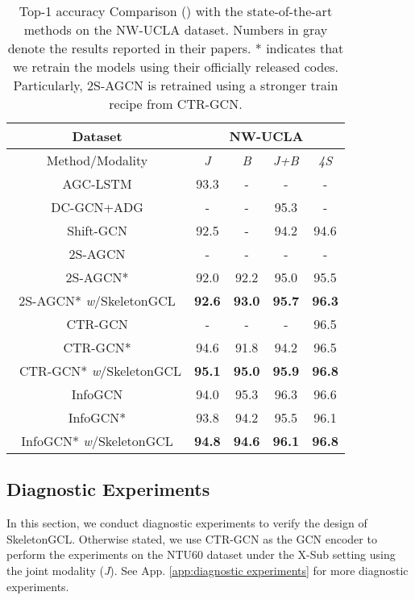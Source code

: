 \documentclass{article} \usepackage{iclr2023_conference,times}
\begin{document}
\begin{table}[h]
    \centering
    \scriptsize
    \caption{Top-1 accuracy Comparison () with the state-of-the-art methods on the NW-UCLA dataset. Numbers in gray denote the results reported in their papers. * indicates that we retrain the models using their officially released codes. Particularly, 2S-AGCN is retrained using a stronger train recipe from CTR-GCN.}
    \begin{tabular}{c||c|c|c|c}
\rowcolor{gray!30} Dataset & \multicolumn{4}{c}{NW-UCLA} \\\hline
        \rowcolor{gray!30} Method/Modality & \textit{J} & \textit{B} & \textit{J+B} & \textit{4S} \\
        \hline \hline
        AGC-LSTM \citep{AGC-LSTM} & 93.3 & - & - & - \\
        DC-GCN+ADG \citep{decouplinggcn} & - & - & 95.3 & - \\ 
        Shift-GCN \citep{shiftgcn} & 92.5 & - & 94.2 & 94.6 \\
        \hline \hline 
        {\color{gray}2S-AGCN \citep{2SAGCN}} & - & - & - & - \\
        2S-AGCN* \citep{2SAGCN} & 92.0 & 92.2 & 95.0 & 95.5 \\
        2S-AGCN* \textit{w}/SkeletonGCL & \textbf{92.6} & \textbf{93.0} & \textbf{95.7} & \textbf{96.3} \\
        \hline \hline
        {\color{gray} CTR-GCN \citep{CTRGCN}} & - & - & - & {\color{gray}96.5} \\
        CTR-GCN* \citep{CTRGCN} & 94.6 & 91.8 & 94.2 & 96.5 \\\
        CTR-GCN* \textit{w}/SkeletonGCL & \textbf{95.1} & \textbf{95.0} & \textbf{95.9 }& \textbf{96.8} \\
        \hline \hline
        {\color{gray}InfoGCN \citep{INFOGCN}} & {\color{gray}94.0} & {\color{gray}95.3} & {\color{gray}96.3} & {\color{gray}96.6} \\
        InfoGCN* \citep{INFOGCN} & 93.8 & 94.2 & 95.5 & 96.1 \\
        InfoGCN* \textit{w}/SkeletonGCL & \textbf{94.8} & \textbf{94.6} & \textbf{96.1} & \textbf{96.8} \\
        \hline
    \end{tabular}
    \label{tab:sota nwucla}
\end{table}

\subsection{Diagnostic Experiments}
\label{exp:dia}
In this section, we conduct diagnostic experiments to verify the design of SkeletonGCL. Otherwise stated, we use CTR-GCN as the GCN encoder to perform the experiments on the NTU60 dataset under the X-Sub setting using the joint modality (\textit{J}). See App. \ref{app:diagnostic experiments} for more diagnostic experiments. 
\end{document}

